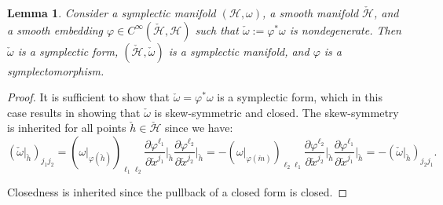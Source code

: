 \documentclass{article}
\theoremstyle{plain}
\newtheorem{lemma}[theorem]{Lemma}
\theoremstyle{definition}
\theoremstyle{remark}
\begin{document}
\begin{lemma}
\textit{Consider a symplectic manifold $(\mathcal{H}, \omega)$, a smooth manifold $\check{\mathcal{H}}$, and a smooth embedding $\varphi \in C^{\infty}(\check{\mathcal{H}}, \mathcal{H})$ such that $\check{\omega} := \varphi^* \omega$ is nondegenerate. Then $\check{\omega}$ is a symplectic form, $(\check{\mathcal{H}}, \check{\omega})$ is a symplectic manifold, and $\varphi$ is a symplectomorphism.}
\end{lemma}
\begin{proof}
It is sufficient to show that $\check{\omega} = \varphi^*\omega$ is a symplectic form, which in this case results in showing that $\check{\omega}$ is skew-symmetric and closed. The skew-symmetry is inherited for all points $\check{h} \in \check{\mathcal{H}}$ since we have:
\begin{equation*}
(\check{\omega}|_{\check{h}})_{j_1 j_2} = (\omega|_{\varphi(\check{h})})_{\ell_1 \ell_2} \frac{\partial\varphi^{\ell_1}}{\partial \check{x}^{j_1}}\bigg|_{\check{h}} \frac{\partial\varphi^{\ell_2}}{\partial \check{x}^{j_2}}\bigg|_{\check{h}} = -(\omega|_{\varphi(\check{m})})_{\ell_2 \ell_1} \frac{\partial\varphi^{\ell_2}}{\partial \check{x}^{j_2}}\bigg|_{\check{h}} \frac{\partial\varphi^{\ell_1}}{\partial \check{x}^{j_1}}\bigg|_{\check{h}} = -(\check{\omega}|_{\check{h}})_{j_2 j_1}.
\end{equation*}

Closedness is inherited since the pullback of a closed form is closed. 
\end{proof}
\end{document}
